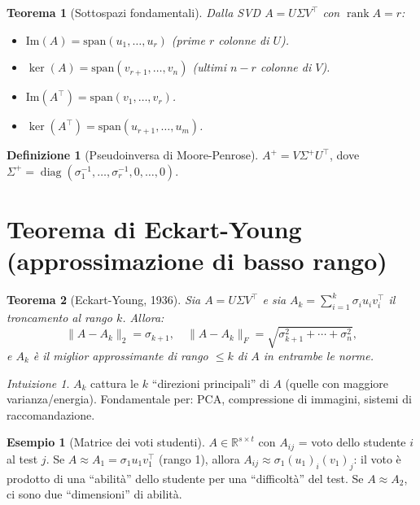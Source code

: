 \documentclass[11pt, a4paper, twoside]{book}
\theoremstyle{definition}
\newtheorem{defn}{Definizione}[chapter]
\newtheorem{example}{Esempio}[chapter]
\theoremstyle{plain}
\newtheorem{thm}{Teorema}[chapter]
\theoremstyle{remark}
\newtheorem{intuition}{Intuizione}[chapter]
\DeclareMathOperator{\rank}{rank}
\DeclareMathOperator{\diag}{diag}
\newcommand{\R}{\mathbb{R}}
\begin{document}
\begin{thm}[Sottospazi fondamentali]
Dalla SVD $A = U\Sigma V^\top$ con $\rank A = r$:
\begin{itemize}
  \item $\mathrm{Im}(A) = \mathrm{span}(u_1, \ldots, u_r)$ (prime $r$ colonne di $U$).
  \item $\ker(A) = \mathrm{span}(v_{r+1}, \ldots, v_n)$ (ultimi $n-r$ colonne di $V$).
  \item $\mathrm{Im}(A^\top) = \mathrm{span}(v_1, \ldots, v_r)$.
  \item $\ker(A^\top) = \mathrm{span}(u_{r+1}, \ldots, u_m)$.
\end{itemize}
\end{thm}

\begin{defn}[Pseudoinversa di Moore-Penrose]
$A^+ = V \Sigma^+ U^\top$, dove $\Sigma^+ = \diag(\sigma_1^{-1}, \ldots, \sigma_r^{-1}, 0, \ldots, 0)$.
\end{defn}

\section{Teorema di Eckart-Young (approssimazione di basso rango)}
\label{sec:eckart-young}

\begin{thm}[Eckart-Young, 1936]
Sia $A = U\Sigma V^\top$ e sia $A_k = \sum_{i=1}^k \sigma_i u_i v_i^\top$ il \emph{troncamento al rango $k$}. Allora:
\[
  \|A - A_k\|_2 = \sigma_{k+1}, \quad \|A - A_k\|_F = \sqrt{\sigma_{k+1}^2 + \cdots + \sigma_n^2},
\]
e $A_k$ è il miglior approssimante di rango $\leq k$ di $A$ in entrambe le norme.
\end{thm}

\begin{intuition}
$A_k$ cattura le $k$ ``direzioni principali'' di $A$ (quelle con maggiore varianza/energia). Fondamentale per: PCA, compressione di immagini, sistemi di raccomandazione.
\end{intuition}

\begin{example}[Matrice dei voti studenti]
$A \in \R^{s \times t}$ con $A_{ij}$ = voto dello studente $i$ al test $j$. Se $A \approx A_1 = \sigma_1 u_1 v_1^\top$ (rango 1), allora $A_{ij} \approx \sigma_1 (u_1)_i (v_1)_j$: il voto è prodotto di una ``abilità'' dello studente per una ``difficoltà'' del test. Se $A \approx A_2$, ci sono due ``dimensioni'' di abilità.
\end{example}
\end{document}
